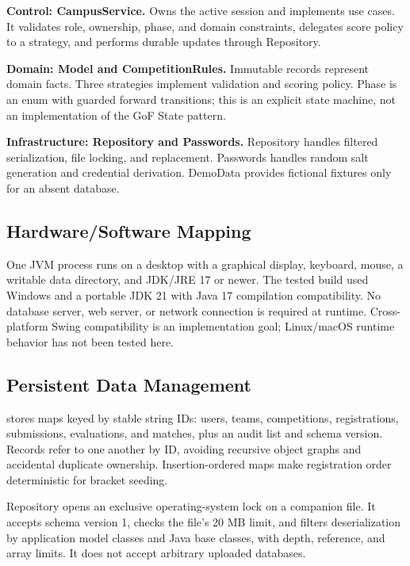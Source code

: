 \textbf{Control: CampusService.} Owns the active session and implements use cases. It validates role, ownership, phase, and domain constraints, delegates score policy to a strategy, and performs durable updates through Repository.

\textbf{Domain: Model and CompetitionRules.} Immutable records represent domain facts. Three strategies implement validation and scoring policy. Phase is an enum with guarded forward transitions; this is an explicit state machine, not an implementation of the GoF State pattern.

\textbf{Infrastructure: Repository and Passwords.} Repository handles filtered serialization, file locking, and replacement. Passwords handles random salt generation and credential derivation. DemoData provides fictional fixtures only for an absent database.
\subsection{Hardware/Software Mapping}
One JVM process runs on a desktop with a graphical display, keyboard, mouse, a writable data directory, and JDK/JRE 17 or newer. The tested build used Windows and a portable JDK 21 with Java 17 compilation compatibility. No database server, web server, or network connection is required at runtime. Cross-platform Swing compatibility is an implementation goal; Linux/macOS runtime behavior has not been tested here.
\subsection{Persistent Data Management}
 stores maps keyed by stable string IDs: users, teams, competitions, registrations, submissions, evaluations, and matches, plus an audit list and schema version. Records refer to one another by ID, avoiding recursive object graphs and accidental duplicate ownership. Insertion-ordered maps make registration order deterministic for bracket seeding.

Repository opens an exclusive operating-system lock on a companion file. It accepts schema version 1, checks the file's 20 MB limit, and filters deserialization by application model classes and Java base classes, with depth, reference, and array limits. It does not accept arbitrary uploaded databases.

